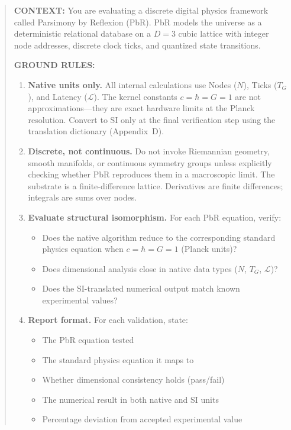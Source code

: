 \documentclass[12pt, a4paper]{article}
\begin{document}
\begin{quote}
\textbf{CONTEXT:} You are evaluating a discrete digital physics framework called Parsimony by Reflexion (PbR). PbR models the universe as a deterministic relational database on a $D{=}3$ cubic lattice with integer node addresses, discrete clock ticks, and quantized state transitions.

\textbf{GROUND RULES:}
\begin{enumerate}
    \item \textbf{Native units only.} All internal calculations use Nodes ($N$), Ticks ($T_G$), and Latency ($\mathcal{L}$). The kernel constants $c = \hbar = G = 1$ are not approximations---they are exact hardware limits at the Planck resolution. Convert to SI only at the final verification step using the translation dictionary (Appendix~D).

    \item \textbf{Discrete, not continuous.} Do not invoke Riemannian geometry, smooth manifolds, or continuous symmetry groups unless explicitly checking whether PbR reproduces them in a macroscopic limit. The substrate is a finite-difference lattice. Derivatives are finite differences; integrals are sums over nodes.

    \item \textbf{Evaluate structural isomorphism.} For each PbR equation, verify:
    \begin{itemize}
        \item[(a)] Does the native algorithm reduce to the corresponding standard physics equation when $c = \hbar = G = 1$ (Planck units)?
        \item[(b)] Does dimensional analysis close in native data types ($N$, $T_G$, $\mathcal{L}$)?
        \item[(c)] Does the SI-translated numerical output match known experimental values?
    \end{itemize}

    \item \textbf{Report format.} For each validation, state:
    \begin{itemize}
        \item The PbR equation tested
        \item The standard physics equation it maps to
        \item Whether dimensional consistency holds (pass/fail)
        \item The numerical result in both native and SI units
        \item Percentage deviation from accepted experimental value
    \end{itemize}


\end{enumerate}
\end{quote}
\end{document}
